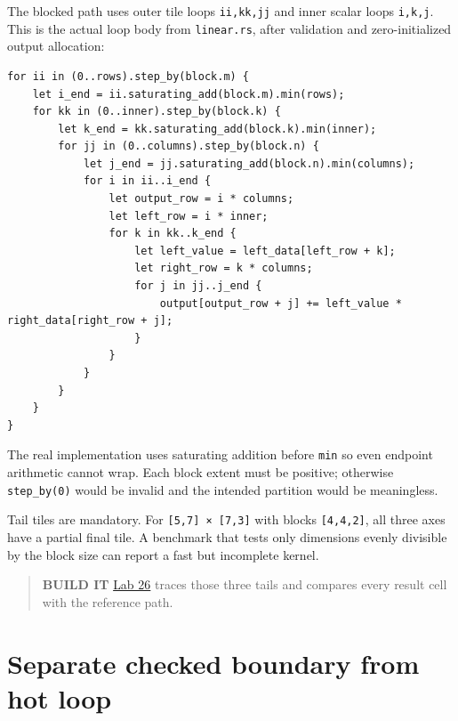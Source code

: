 The blocked path uses outer tile loops \texttt{ii,kk,jj} and inner
scalar loops \texttt{i,k,j}. This is the actual loop body from
\texttt{linear.rs}, after validation and zero-initialized output
allocation:

\begin{verbatim}
for ii in (0..rows).step_by(block.m) {
    let i_end = ii.saturating_add(block.m).min(rows);
    for kk in (0..inner).step_by(block.k) {
        let k_end = kk.saturating_add(block.k).min(inner);
        for jj in (0..columns).step_by(block.n) {
            let j_end = jj.saturating_add(block.n).min(columns);
            for i in ii..i_end {
                let output_row = i * columns;
                let left_row = i * inner;
                for k in kk..k_end {
                    let left_value = left_data[left_row + k];
                    let right_row = k * columns;
                    for j in jj..j_end {
                        output[output_row + j] += left_value * right_data[right_row + j];
                    }
                }
            }
        }
    }
}
\end{verbatim}

The real implementation uses saturating addition before \texttt{min} so
even endpoint arithmetic cannot wrap. Each block extent must be
positive; otherwise \texttt{step\_by(0)} would be invalid and the
intended partition would be meaningless.

Tail tiles are mandatory. For \texttt{{[}5,7{]}\ ×\ {[}7,3{]}} with
blocks \texttt{{[}4,4,2{]}}, all three axes have a partial final tile. A
benchmark that tests only dimensions evenly divisible by the block size
can report a fast but incomplete kernel.

\begin{quote}
\textbf{BUILD IT}
\href{https://github.com/hermonai/inside-the-llm-engine/blob/astra-visual-rewrite/labs/lab-26-blocked-gemm.md}{Lab
26} traces those three tails and compares every result cell with the
reference path.
\end{quote}

\section{Separate checked boundary from hot
loop}\label{separate-checked-boundary-from-hot-loop}


